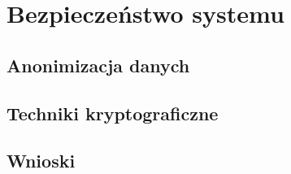 \newpage\section{Bezpieczeństwo systemu \NazwaSys} \label{sec:bezpieczenstwo}
\subsection{Anonimizacja danych}
\subsection{Techniki kryptograficzne}
\subsection{Wnioski}
 
